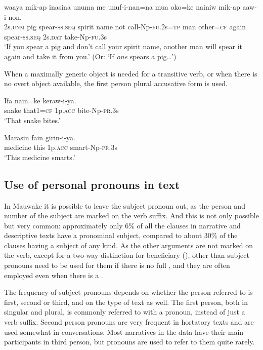 \ea%
\label{ex:3:x622}
\gll {} waaya mik-ap inasina unuma me unuf-i-nan=na mua oko=ke nainiw mik-ap  aaw-i-non.\\
2s.\textsc{unm} pig spear-\textsc{ss}.\textsc{seq} spirit name not call-Np-\textsc{fu}.2s=\textsc{tp} man other=\textsc{cf} again spear-\textsc{ss}.\textsc{seq} 2s.\textsc{dat} take-Np-\textsc{fu}.3s\\
\glt`If you spear a pig and don't call your spirit name, another man will spear it again and take it from you.' (Or: `If \textit{one} spears a pig{\dots}')
\z

When a maximally generic object is needed for a transitive verb, or when there is no overt object available, the first person plural accusative form is used. 

\ea%
\label{ex:3:x623}
\gll Ifa nain=ke  keraw-i-ya. \\
snake that1=\textsc{cf} 1p.\textsc{acc} bite-Np-\textsc{pr}.3s\\
\glt`That snake bites.'
\z

\ea%
\label{ex:3:x624}
\gll Marasin fain  girin-i-ya. \\
medicine this 1p.\textsc{acc} smart-Np-\textsc{pr}.3s\\
\glt`This medicine smarts.'
\z

\subsection{Use of personal pronouns in text}\label{sec:3:y:x}
{}
In Mauwake it is possible to leave the subject pronoun out, as the person and number of the subject are marked on the verb suffix. And this is not only possible but very common: approximately only 6\% of all the clauses in narrative and descriptive texts have a pronominal subject, compared to about 30\% of the clauses having a subject  of any kind. As the other arguments are not marked on the verb, except for a two-way distinction for beneficiary (), other than subject pronouns need to be used for them if there is no full , and they are often employed even when there is a .

The frequency of subject pronouns depends on whether the person referred to is first, second or third, and on the type of text as well. The first person, both in singular and plural, is commonly referred to with a pronoun, instead of just a verb suffix. Second person pronouns are very frequent in hortatory texts and are used somewhat in conversations. Most narratives in the data have their main participants in third person, but pronouns are used to refer to them quite rarely. 

